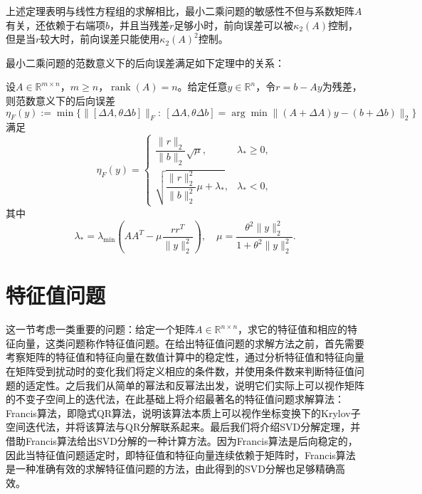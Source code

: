 \documentclass[a4paper,10pt]{ctexart}
\begin{document}
上述定理表明与线性方程组的求解相比，最小二乘问题的敏感性不但与系数矩阵$ A $有关，还依赖于右端项$ b $，并且当残差$ r $足够小时，前向误差可以被$ \kappa_2(A) $控制，但是当$ r $较大时，前向误差只能使用$ \kappa_2(A)^2 $控制。

最小二乘问题的范数意义下的后向误差满足如下定理中的关系：
\begin{theorem}
    设$ A\in \mathbb{R}^{m\times n} $，$ m\geqslant n $，$ \operatorname{rank}(A)=n $。给定任意$ y\in \mathbb{R}^n $，令$ r=b-Ay $为残差，则范数意义下的后向误差
    \begin{equation}
        \eta_F(y):=\min\{\| [\Delta A,\theta \Delta b] \|_F:\  [\Delta A,\theta \Delta b] = \arg\min\| (A+\Delta A)y - (b+\Delta b) \|_2  \}
    \end{equation}
    满足
    \begin{equation}
        \eta_F(y) = 
        \begin{cases}
            \dfrac{\| r \|_2}{\| b \|_2}\sqrt{\mu} , & \lambda_*\geqslant 0,\\
            \sqrt{\dfrac{\| r \|^2_2}{\| b \|^2_2}\mu + \lambda_*} , & \lambda_*<0,
        \end{cases}
    \end{equation}
    其中
    \[
        \lambda_* = \lambda_{\min} \left( AA^T - \mu \frac{rr^T}{\| y \|_2^2} \right),\quad \mu = \frac{\theta^2\| y \|_2^2}{1+\theta^2\| y \|_2^2}.
    \]
\end{theorem}

\section{特征值问题}
这一节考虑一类重要的问题：给定一个矩阵$ A\in \mathbb{R}^{n\times n} $，求它的特征值和相应的特征向量，这类问题称作特征值问题。在给出特征值问题的求解方法之前，首先需要考察矩阵的特征值和特征向量在数值计算中的稳定性，通过分析特征值和特征向量在矩阵受到扰动时的变化我们将定义相应的条件数，并使用条件数来判断特征值问题的适定性。之后我们从简单的幂法和反幂法出发，说明它们实际上可以视作矩阵的不变子空间上的迭代法，在此基础上将介绍最著名的特征值问题求解算法：Francis算法，即隐式QR算法，说明该算法本质上可以视作坐标变换下的Krylov子空间迭代法，并将该算法与QR分解联系起来。最后我们将介绍SVD分解定理，并借助Francis算法给出SVD分解的一种计算方法。因为Francis算法是后向稳定的，因此当特征值问题适定时，即特征值和特征向量连续依赖于矩阵时，Francis算法是一种准确有效的求解特征值问题的方法，由此得到的SVD分解也足够精确高效。
\end{document}
